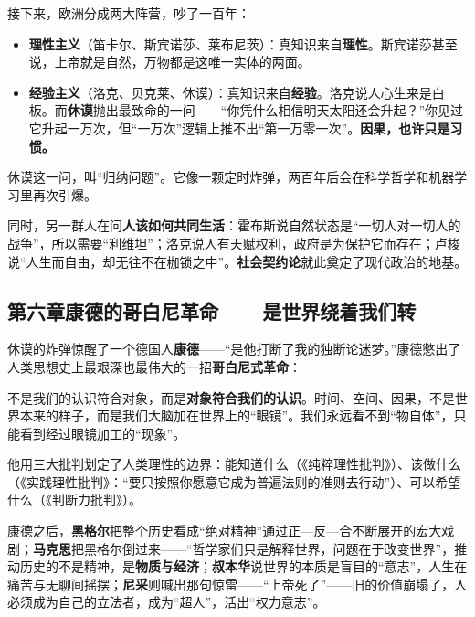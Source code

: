 \documentclass[12pt,a4paper,fontset=none]{ctexart}
\newcommand{\saying}[1]{{\notomed\color{accent}#1}}
\begin{document}
接下来，欧洲分成两大阵营，吵了一百年：

\begin{itemize}[leftmargin=2.4em,itemsep=0.2em]
\item \textbf{理性主义}（笛卡尔、斯宾诺莎、莱布尼茨）：真知识来自\textbf{理性}。斯宾诺莎甚至说，上帝就是自然，万物都是这唯一实体的两面。
\item \textbf{经验主义}（洛克、贝克莱、休谟）：真知识来自\textbf{经验}。洛克说人心生来是白板。而\textbf{休谟}抛出最致命的一问——\saying{“你凭什么相信明天太阳还会升起？”}你见过它升起一万次，但“一万次”逻辑上推不出“第一万零一次”。\textbf{因果，也许只是习惯。}
\end{itemize}

\begin{note}
休谟这一问，叫“归纳问题”。它像一颗定时炸弹，两百年后会在科学哲学和机器学习里再次引爆。
\end{note}

同时，另一群人在问\textbf{人该如何共同生活}：霍布斯说自然状态是“一切人对一切人的战争”，所以需要“利维坦”；洛克说人有天赋权利，政府是为保护它而存在；卢梭说“人生而自由，却无往不在枷锁之中”。\textbf{社会契约论}就此奠定了现代政治的地基。

\subsection{第六章\quad 康德的哥白尼革命——是世界绕着我们转}

休谟的炸弹惊醒了一个德国人\textbf{康德}——“是他打断了我的独断论迷梦。”康德憋出了人类思想史上最艰深也最伟大的一招\textbf{哥白尼式革命}：

\begin{mainline}
不是我们的认识符合对象，而是\textbf{对象符合我们的认识}。时间、空间、因果，不是世界本来的样子，而是我们大脑加在世界上的“眼镜”。我们永远看不到“物自体”，只能看到经过眼镜加工的“现象”。
\end{mainline}

他用三大批判划定了人类理性的边界：能知道什么（《纯粹理性批判》）、该做什么（《实践理性批判》：\saying{“要只按照你愿意它成为普遍法则的准则去行动”}）、可以希望什么（《判断力批判》）。

康德之后，\textbf{黑格尔}把整个历史看成“绝对精神”通过正—反—合不断展开的宏大戏剧；\textbf{马克思}把黑格尔倒过来——“哲学家们只是解释世界，问题在于改变世界”，推动历史的不是精神，是\textbf{物质与经济}；\textbf{叔本华}说世界的本质是盲目的“意志”，人生在痛苦与无聊间摇摆；\textbf{尼采}则喊出那句惊雷——\saying{“上帝死了”}——旧的价值崩塌了，人必须成为自己的立法者，成为“超人”，活出“权力意志”。
\end{document}
